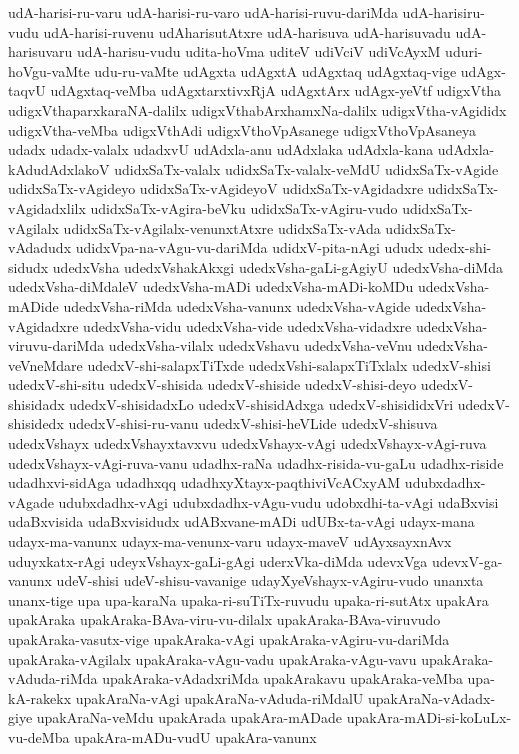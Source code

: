 {udA-harisi-ru-varu
udA-harisi-ru-varo
udA-harisi-ruvu-dariMda
udA-harisiru-vudu
udA-harisi-ruvenu
udAharisutAtxre
udA-harisuva
udA-harisuvadu
udA-harisuvaru
udA-harisu-vudu
udita-hoVma
uditeV
udiVciV
udiVcAyxM
uduri-hoVgu-vaMte
udu-ru-vaMte
udAgxta
udAgxtA
udAgxtaq
udAgxtaq-vige
udAgx-taqvU
udAgxtaq-veMba
udAgxtarxtivxRjA
udAgxtArx
udAgx-yeVtf
udigxVtha
udigxVthaparxkaraNA-dalilx
udigxVthabArxhamxNa-dalilx
udigxVtha-vAgididx
udigxVtha-veMba
udigxVthAdi
udigxVthoVpAsanege
udigxVthoVpAsaneya
udadx
udadx-valalx
udadxvU
udAdxla-anu
udAdxlaka
udAdxla-kana
udAdxla-kAdudAdxlakoV
udidxSaTx-valalx
udidxSaTx-valalx-veMdU
udidxSaTx-vAgide
udidxSaTx-vAgideyo
udidxSaTx-vAgideyoV
udidxSaTx-vAgidadxre
udidxSaTx-vAgidadxlilx
udidxSaTx-vAgira-beVku
udidxSaTx-vAgiru-vudo
udidxSaTx-vAgilalx
udidxSaTx-vAgilalx-venunxtAtxre
udidxSaTx-vAda
udidxSaTx-vAdadudx
udidxVpa-na-vAgu-vu-dariMda
udidxV-pita-nAgi
ududx
udedx-shi-sidudx
udedxVsha
udedxVshakAkxgi
udedxVsha-gaLi-gAgiyU
udedxVsha-diMda
udedxVsha-diMdaleV
udedxVsha-mADi
udedxVsha-mADi-koMDu
udedxVsha-mADide
udedxVsha-riMda
udedxVsha-vanunx
udedxVsha-vAgide
udedxVsha-vAgidadxre
udedxVsha-vidu
udedxVsha-vide
udedxVsha-vidadxre
udedxVsha-viruvu-dariMda
udedxVsha-vilalx
udedxVshavu
udedxVsha-veVnu
udedxVsha-veVneMdare
udedxV-shi-salapxTiTxde
udedxVshi-salapxTiTxlalx
udedxV-shisi
udedxV-shi-situ
udedxV-shisida
udedxV-shiside
udedxV-shisi-deyo
udedxV-shisidadx
udedxV-shisidadxLo
udedxV-shisidAdxga
udedxV-shisididxVri
udedxV-shisidedx
udedxV-shisi-ru-vanu
udedxV-shisi-heVLide
udedxV-shisuva
udedxVshayx
udedxVshayxtavxvu
udedxVshayx-vAgi
udedxVshayx-vAgi-ruva
udedxVshayx-vAgi-ruva-vanu
udadhx-raNa
udadhx-risida-vu-gaLu
udadhx-riside
udadhxvi-sidAga
udadhxqq
udadhxyXtayx-paqthiviVcACxyAM
udubxdadhx-vAgade
udubxdadhx-vAgi
udubxdadhx-vAgu-vudu
udobxdhi-ta-vAgi
udaBxvisi
udaBxvisida
udaBxvisidudx
udABxvane-mADi
udUBx-ta-vAgi
udayx-mana
udayx-ma-vanunx
udayx-ma-venunx-varu
udayx-maveV
udAyxsayxnAvx
uduyxkatx-rAgi
udeyxVshayx-gaLi-gAgi
uderxVka-diMda
udevxVga
udevxV-ga-vanunx
udeV-shisi
udeV-shisu-vavanige
udayXyeVshayx-vAgiru-vudo
unanxta
unanx-tige
upa
upa-karaNa
upaka-ri-suTiTx-ruvudu
upaka-ri-sutAtx
upakAra
upakAraka
upakAraka-BAva-viru-vu-dilalx
upakAraka-BAva-viruvudo
upakAraka-vasutx-vige
upakAraka-vAgi
upakAraka-vAgiru-vu-dariMda
upakAraka-vAgilalx
upakAraka-vAgu-vadu
upakAraka-vAgu-vavu
upakAraka-vAduda-riMda
upakAraka-vAdadxriMda
upakArakavu
upakAraka-veMba
upa-kA-rakekx
upakAraNa-vAgi
upakAraNa-vAduda-riMdalU
upakAraNa-vAdadx-giye
upakAraNa-veMdu
upakArada
upakAra-mADade
upakAra-mADi-si-koLuLx-vu-deMba
upakAra-mADu-vudU
upakAra-vanunx
}

